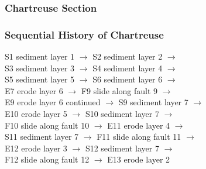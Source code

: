 \documentclass{beamer}
\begin{document}
	\begin{frame}
	\frametitle{Chartreuse Section}
	\end{frame}
	
	\begin{frame}
	\frametitle{Sequential History of Chartreuse}
	S1 sediment layer 1  $\rightarrow$ 	S2 sediment layer 2 $\rightarrow$ \\
	S3 sediment layer 3 $\rightarrow$  	S4 sediment layer 4 $\rightarrow$ \\
	S5 sediment layer 5  $\rightarrow$ 	S6 sediment layer 6 $\rightarrow$ \\
	E7 erode layer 6 $\rightarrow$  	F9 slide along fault 9 $\rightarrow$ \\
	E9 erode layer 6 continued  $\rightarrow$ 	S9 sediment layer 7 $\rightarrow$ \\
	E10 erode layer 5  	 $\rightarrow$   S10 sediment layer 7 $\rightarrow$ \\
	F10 slide along fault 10   $\rightarrow$   E11 erode layer 4 $\rightarrow$ \\
	S11 sediment layer 7   $\rightarrow$   F11 slide along fault 11 $\rightarrow$ \\
	E12 erode layer 3  $\rightarrow$    S12 sediment layer 7 $\rightarrow$ \\
	F12 slide along fault 12   $\rightarrow$   E13 erode layer 2\\
	\end{frame}	

	
\end{document}
